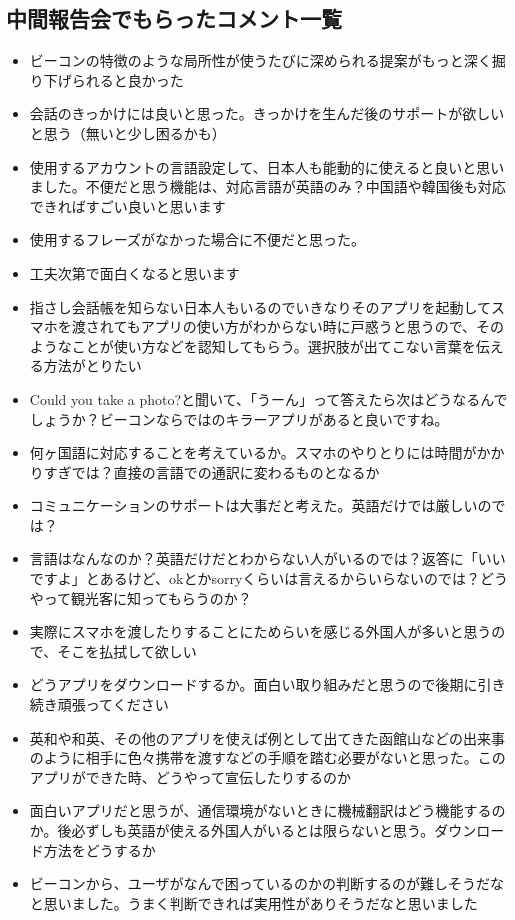 \documentclass[11pt,papersize]{jsbook}
\begin{document}
\begin{appendix}
\chapter{中間報告会でもらったコメント一覧}
\begin{itemize}
 \item ビーコンの特徴のような局所性が使うたびに深められる提案がもっと深く掘り下げられると良かった
 \item 会話のきっかけには良いと思った。きっかけを生んだ後のサポートが欲しいと思う（無いと少し困るかも）
 \item 使用するアカウントの言語設定して、日本人も能動的に使えると良いと思いました。不便だと思う機能は、対応言語が英語のみ？中国語や韓国後も対応できればすごい良いと思います
 \item 使用するフレーズがなかった場合に不便だと思った。
 \item 工夫次第で面白くなると思います
 \item 指さし会話帳を知らない日本人もいるのでいきなりそのアプリを起動してスマホを渡されてもアプリの使い方がわからない時に戸惑うと思うので、そのようなことが使い方などを認知してもらう。選択肢が出てこない言葉を伝える方法がとりたい
 \item Could you take a photo?と聞いて、「うーん」って答えたら次はどうなるんでしょうか？ビーコンならではのキラーアプリがあると良いですね。
 \item 何ヶ国語に対応することを考えているか。スマホのやりとりには時間がかかりすぎでは？直接の言語での通訳に変わるものとなるか
 \item コミュニケーションのサポートは大事だと考えた。英語だけでは厳しいのでは？
 \item 言語はなんなのか？英語だけだとわからない人がいるのでは？返答に「いいですよ」とあるけど、okとかsorryくらいは言えるからいらないのでは？どうやって観光客に知ってもらうのか？
 \item 実際にスマホを渡したりすることにためらいを感じる外国人が多いと思うので、そこを払拭して欲しい
 \item どうアプリをダウンロードするか。面白い取り組みだと思うので後期に引き続き頑張ってください
 \item 英和や和英、その他のアプリを使えば例として出てきた函館山などの出来事のように相手に色々携帯を渡すなどの手順を踏む必要がないと思った。このアプリができた時、どうやって宣伝したりするのか
 \item 面白いアプリだと思うが、通信環境がないときに機械翻訳はどう機能するのか。後必ずしも英語が使える外国人がいるとは限らないと思う。ダウンロード方法をどうするか
 \item ビーコンから、ユーザがなんで困っているのかの判断するのが難しそうだなと思いました。うまく判断できれば実用性がありそうだなと思いました

\end{itemize}
\end{appendix}
\end{document}
